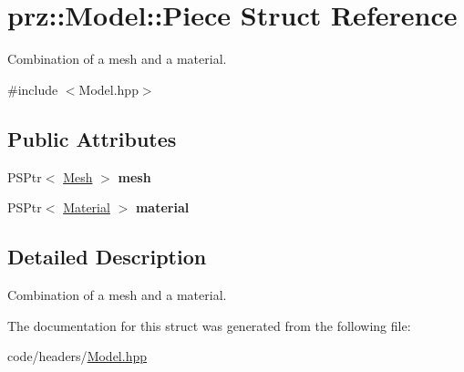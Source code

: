 \hypertarget{structprz_1_1_model_1_1_piece}{}\section{prz\+::Model\+::Piece Struct Reference}
\label{structprz_1_1_model_1_1_piece}


Combination of a mesh and a material.  




{\ttfamily \#include $<$Model.\+hpp$>$}

\subsection*{Public Attributes}
\begin{DoxyCompactItemize}
\item 
\mbox{\label{structprz_1_1_model_1_1_piece_a7e63500bba66f4ae45aa1240350841f1}} 
P\+S\+Ptr$<$ \mbox{\hyperlink{classprz_1_1_mesh}{Mesh}} $>$ {\bfseries mesh}
\item 
\mbox{\label{structprz_1_1_model_1_1_piece_a78e1851b83c34dc0a07cde7707317318}} 
P\+S\+Ptr$<$ \mbox{\hyperlink{classprz_1_1_material}{Material}} $>$ {\bfseries material}
\end{DoxyCompactItemize}


\subsection{Detailed Description}
Combination of a mesh and a material. 



The documentation for this struct was generated from the following file\+:\begin{DoxyCompactItemize}
\item 
code/headers/\mbox{\hyperlink{_model_8hpp}{Model.\+hpp}}\end{DoxyCompactItemize}
